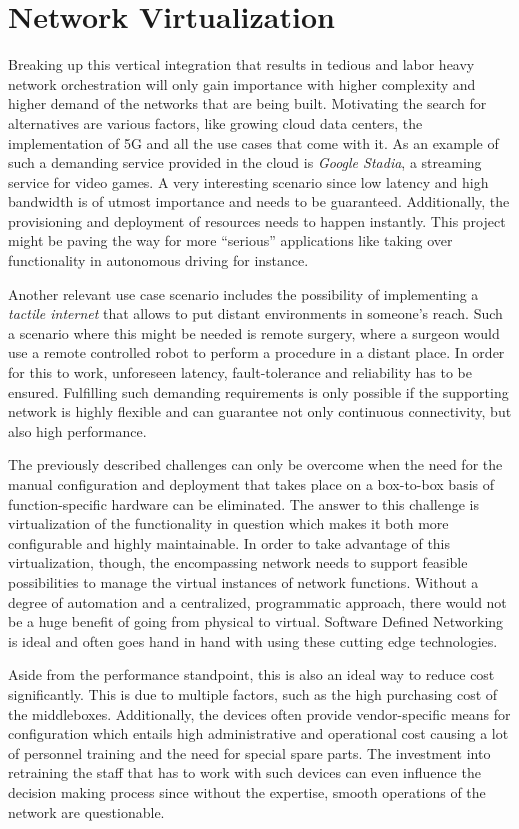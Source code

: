\section{Network Virtualization}
\label{sec:networkV}
Breaking up this vertical integration that results in tedious and labor heavy network orchestration will only gain importance with higher complexity and higher demand of the networks that are being built. Motivating the search for alternatives are various factors, like growing cloud data centers, the implementation of 5G and all the use cases that come with it. As an example of such a demanding service provided in the cloud is \textit{Google Stadia}, a streaming service for video games. A very interesting scenario since low latency and high bandwidth is of utmost importance and needs to be guaranteed. Additionally, the provisioning and deployment of resources needs to happen instantly. This project might be paving the way for more ``serious'' applications like taking over functionality in autonomous driving for instance. 

Another relevant use case scenario includes the possibility of implementing a \textit{tactile internet} that allows to put distant environments in someone's reach. Such a scenario where this might be needed is remote surgery, where a surgeon would use a remote controlled robot to perform a procedure in a distant place. In order for this to work, unforeseen latency, fault-tolerance and reliability has to be ensured. Fulfilling such demanding requirements is only possible if the supporting network is highly flexible and can guarantee not only continuous connectivity, but also high performance. 

The previously described challenges can only be overcome when the need for the manual configuration and deployment that takes place on a box-to-box basis of function-specific hardware can be eliminated. The answer to this challenge is virtualization of the functionality in question which makes it both more configurable and highly maintainable. In order to take advantage of this virtualization, though, the encompassing network needs to support feasible possibilities to manage the virtual instances of network functions. Without a degree of automation and a centralized, programmatic approach, there would not be a huge benefit of going from physical to virtual. Software Defined Networking is ideal and often goes hand in hand with using these cutting edge technologies.

Aside from the performance standpoint, this is also an ideal way to reduce cost significantly. This is due to multiple factors, such as the high purchasing cost of the middleboxes. Additionally, the devices often provide vendor-specific means for configuration which entails high administrative and operational cost causing a lot of personnel training and the need for special spare parts.  The investment into retraining the staff that has to work with such devices can even influence the decision making process since without the expertise, smooth operations of the network are questionable. 

